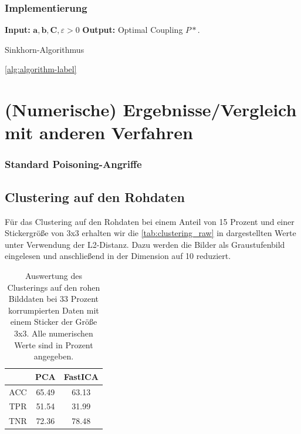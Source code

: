 \documentclass[11pt,a4paper]{article}
\numberwithin{equation}{section}
\begin{document}
	
	\subsubsection{Implementierung}
	\begin{algorithm}
		\hspace*{\algorithmicindent} \textbf{Input: } $\boldsymbol{a}, \boldsymbol{b}, \boldsymbol{C}, \varepsilon > 0$		\newline
		\hspace*{\algorithmicindent} \textbf{Output: } Optimal Coupling $P*$. 
	
		\caption{Sinkhorn-Algorithmus}
		\label{alg:sinkhorn}
		\begin{algorithmic}
			\REPEAT
		\end{algorithmic}	
	\end{algorithm}


	\ref*{alg:algorithm-label}
	\section{(Numerische) Ergebnisse/Vergleich mit anderen Verfahren} \label{chapter_comparisons}
	
	\subsubsection{Standard Poisoning-Angriffe}
	
	\subsection{Clustering auf den Rohdaten}
	Für das Clustering auf den Rohdaten bei einem Anteil von 15 Prozent und einer Stickergröße von 3x3 erhalten wir die \autoref{tab:clustering_raw} in dargestellten Werte unter Verwendung der L2-Distanz. Dazu werden die Bilder als Graustufenbild eingelesen und anschließend in der Dimension auf 10 reduziert.
	\begin{table}[ht]
		\begin{center}
				\begin{tabular}{c|c|c}
					& PCA & FastICA \\ \hline
					ACC	 & 	65.49 & 63.13 \\
					TPR		& 51.54 & 31.99 \\
					TNR	& 72.36 	&78.48 	 
				\end{tabular}
				\caption[Auswertung des Clusterings auf den rohen Bilddaten]{Auswertung des Clusterings auf den rohen Bilddaten bei 33 Prozent korrumpierten Daten mit einem Sticker der Größe 3x3. Alle numerischen Werte sind in Prozent angegeben.}	
				\label{tab:clustering_raw}
			
			
		\end{center}
	\end{table}
	
\end{document}
